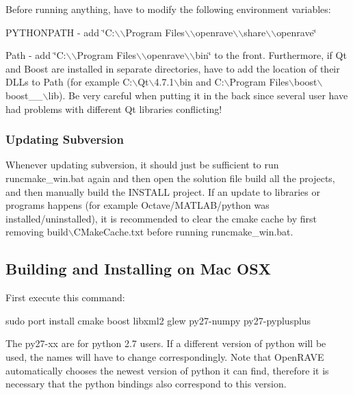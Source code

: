 Before running anything, have to modify the following environment variables:
\begin{DoxyItemize}
\item {\ttfamily PYTHONPATH} -\/ add {\ttfamily \char`\"{}C:$\backslash$$\backslash$Program Files$\backslash$$\backslash$openrave$\backslash$$\backslash$share$\backslash$$\backslash$openrave\char`\"{}}
\item {\ttfamily Path} -\/ add {\ttfamily \char`\"{}C:$\backslash$$\backslash$Program Files$\backslash$$\backslash$openrave$\backslash$$\backslash$bin\char`\"{}} to the front. Furthermore, if Qt and Boost are installed in separate directories, have to add the location of their DLLs to Path (for example {\ttfamily C:$\backslash$Qt$\backslash$4.7.1$\backslash$bin} and {\ttfamily C:$\backslash$Program Files$\backslash$boost$\backslash$boost\_\_$\backslash$lib}). Be very careful when putting it in the back since several user have had problems with different Qt libraries conflicting!
\end{DoxyItemize}\hypertarget{installation__windows_iwin_updating}{}\subsubsection{Updating Subversion}\label{installation__windows_iwin_updating}
Whenever updating subversion, it should just be sufficient to run {\ttfamily runcmake\_\-win.bat} again and then open the solution file build all the projects, and then manually build the INSTALL project. If an update to libraries or programs happens (for example Octave/MATLAB/python was installed/uninstalled), it is recommended to clear the cmake cache by first removing {\ttfamily build$\backslash$CMakeCache.txt} before running {\ttfamily runcmake\_\-win.bat}. \hypertarget{installation_macosx}{}\subsection{Building and Installing on Mac OSX}\label{installation_macosx}
First execute this command:

\begin{DoxyVerb}
sudo port install cmake boost libxml2 glew py27-numpy py27-pyplusplus
\end{DoxyVerb}


The py27-\/xx are for python 2.7 users. If a different version of python will be used, the names will have to change correspondingly. Note that OpenRAVE automatically chooses the newest version of python it can find, therefore it is necessary that the python bindings also correspond to this version.

